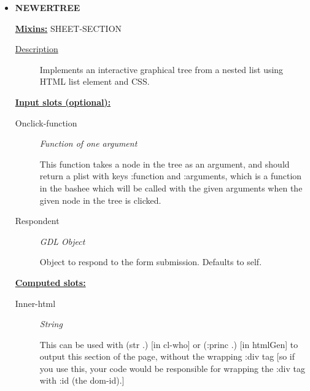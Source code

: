 \documentclass [11pt]{book}
\begin{document}
\begin{itemize}

\item {}
\label{prim:newertree}
\textbf{NEWERTREE}


\textbf{
\underline{Mixins:}} SHEET-SECTION





\begin{description}

\item [
\underline{Description}]


Implements an interactive graphical tree from a nested list using HTML list element and CSS.



\end{description}








\textbf{
\underline{Input slots (optional):}}

\begin{description}

\item [Onclick-function]
\emph{Function of one argument}

 This function takes a node in the tree as an argument, and should return
a plist with keys :function and :arguments, which is a function in the bashee which will be called
with the given arguments when the given node in the tree is clicked.




\item [Respondent]
\emph{GDL Object}

 Object to respond to the form submission. Defaults to self.




\end{description}






\textbf{
\underline{Computed slots:}}

\begin{description}

\item [Inner-html]
\emph{String}

 This can be used with (str .) [in cl-who] or (:princ .) [in htmlGen]
to output this section of the page, without the wrapping :div tag [so if you use this,
your code would be responsible for wrapping the :div tag with :id (the dom-id).]





\end{description}
\end{itemize}
\end{document}
